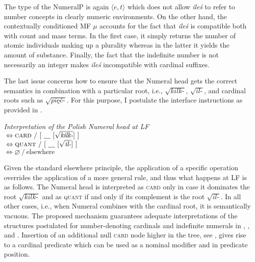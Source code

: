 \documentclass[output=paper,
]{langscibook}
\begin{document}
    The type of the NumeralP is again $\langle e,t\rangle$ which does not allow \textit{ileś} to refer to number concepts in clearly numeric environments. On the other hand, the contextually conditioned MF $\mu$ accounts for the fact that \textit{ileś} is compatible both with count and mass terms. In the first case, it simply returns the number of atomic individuals making up a plurality whereas in the latter it yields the amount of substance. Finally, the fact that the indefinite number is not necessarily an integer makes \textit{ileś} incompatible with cardinal suffixes.
    
    The last issue concerns how to ensure that the Numeral head gets the correct semantics in combination with a particular root, i.e., $\sqrt{\textit{kilk-}}$, $\sqrt{\textit{il-}}$, and cardinal roots such as $\sqrt{\textit{pięć-}}$. For this purpose, I postulate the interface instructions as provided in .

	\ea  \textit{Interpretation of the Polish Numeral head at LF}\smallskip\label{ex:numeral-lf-interpretation}\\
     \tabto{1.5cm}${}\Leftrightarrow \textsc{card}\ /\ [\ \underline{\hspace{1em}}\ [\sqrt{\textit{kilk-}}]\ ]$\\
    \tabto{1.5cm}${}\Leftrightarrow \textsc{quant}\ /\ [\ \underline{\hspace{1em}}\ [\sqrt{\textit{il-}}]\ ]$\vspace{1pt}\\
    \tabto{1.5cm}${}\Leftrightarrow \varnothing\ /\ \text{elsewhere}$
	\z

	\noindent Given the standard elsewhere principle, the application of a specific operation overrides the application of a more general rule, and thus what happens at LF is as follows. The Numeral head is interpreted as \textsc{card} only in case it dominates the root $\sqrt{\textit{kilk-}}$ and as \textsc{quant} if and only if its complement is the root $\sqrt{\textit{il-}}$. In all other cases, i.e., when Numeral combines with the cardinal root, it is semantically vacuous. The proposed mechanism guarantees adequate interpretations of the structures postulated for number-denoting cardinals and indefinite numerals in , , and . Insertion of an additional null \textsc{card} node higher in the tree, see , gives rise to a cardinal predicate which can be used as a nominal modifier and in predicate position.
\end{document}
